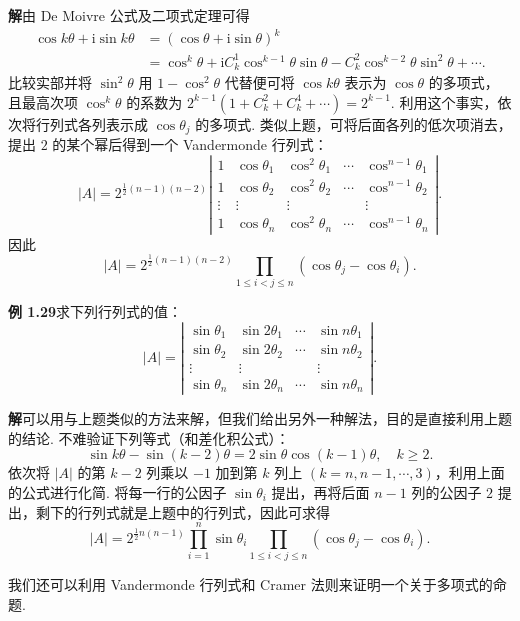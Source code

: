 \documentclass[UTF8,12pt,a4paper,fontset=fandol]{ctexart}
\begin{document}
\noindent\textbf{解}\quad 由 De Moivre 公式及二项式定理可得
\[
\begin{aligned}
\cos k\theta+\mathrm{i}\sin k\theta
&=(\cos\theta+\mathrm{i}\sin\theta)^k\\
&=\cos^k\theta+\mathrm{i}C_k^1\cos^{k-1}\theta\sin\theta
-C_k^2\cos^{k-2}\theta\sin^2\theta+\cdots.
\end{aligned}
\]
比较实部并将 $\sin^2\theta$ 用 $1-\cos^2\theta$ 代替便可将 $\cos k\theta$ 表示为 $\cos\theta$ 的多项式，且最高次项 $\cos^k\theta$ 的系数为 $2^{k-1}(1+C_k^2+C_k^4+\cdots)=2^{k-1}$. 利用这个事实，依次将行列式各列表示成 $\cos\theta_j$ 的多项式. 类似上题，可将后面各列的低次项消去，提出 $2$ 的某个幂后得到一个 Vandermonde 行列式：
\[
|A|=2^{\frac12(n-1)(n-2)}
\left|\begin{array}{ccccc}
1 & \cos\theta_1 & \cos^2\theta_1 & \cdots & \cos^{n-1}\theta_1\\
1 & \cos\theta_2 & \cos^2\theta_2 & \cdots & \cos^{n-1}\theta_2\\
\vdots & \vdots & \vdots &        & \vdots\\
1 & \cos\theta_n & \cos^2\theta_n & \cdots & \cos^{n-1}\theta_n
\end{array}\right|.
\]
因此
\[
|A|=2^{\frac12(n-1)(n-2)}\prod_{1\le i<j\le n}(\cos\theta_j-\cos\theta_i).
\]

\noindent\textbf{例 1.29}\quad 求下列行列式的值：
\[
|A|=\left|\begin{array}{cccc}
\sin\theta_1 & \sin2\theta_1 & \cdots & \sin n\theta_1\\
\sin\theta_2 & \sin2\theta_2 & \cdots & \sin n\theta_2\\
\vdots & \vdots &        & \vdots\\
\sin\theta_n & \sin2\theta_n & \cdots & \sin n\theta_n
\end{array}\right|.
\]

\noindent\textbf{解}\quad 可以用与上题类似的方法来解，但我们给出另外一种解法，目的是直接利用上题的结论. 不难验证下列等式（和差化积公式）：
\[
\sin k\theta-\sin(k-2)\theta=2\sin\theta\cos(k-1)\theta,\quad k\ge2.
\]
依次将 $|A|$ 的第 $k-2$ 列乘以 $-1$ 加到第 $k$ 列上 $(k=n,n-1,\cdots,3)$，利用上面的公式进行化简. 将每一行的公因子 $\sin\theta_i$ 提出，再将后面 $n-1$ 列的公因子 $2$ 提出，剩下的行列式就是上题中的行列式，因此可求得
\[
|A|=2^{\frac12 n(n-1)}\prod_{i=1}^n\sin\theta_i
\prod_{1\le i<j\le n}(\cos\theta_j-\cos\theta_i).
\]

我们还可以利用 Vandermonde 行列式和 Cramer 法则来证明一个关于多项式的命题.
\end{document}
